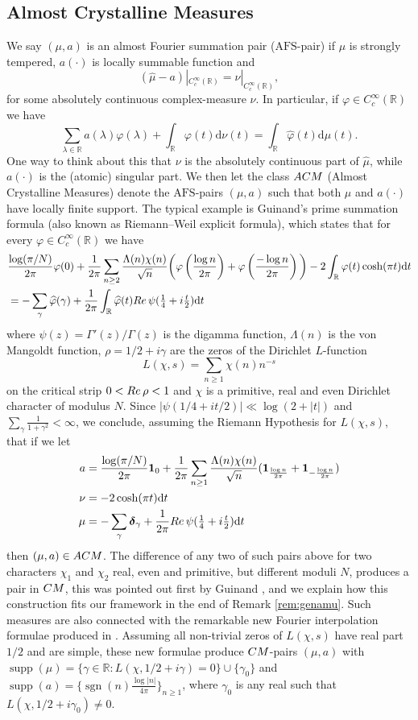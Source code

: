 \documentclass[a4paper,reqno,12pt]{amsart}
\DeclareMathOperator{\sgn}{\mathrm{sgn}}
\DeclareMathOperator{\supp}{\mathrm{supp}}
\renewcommand{\r}{\mathbb{R}}
\newcommand{\ft}{\widehat}
\newcommand{\bo}{\boldsymbol}
\newcommand{\la}{\lambda}
\newcommand{\ga}{\gamma}
\newcommand{\p}{\varphi}
\renewcommand{\d}{\mathrm{d}}
\newcommand{\1}{{\bf 1}}
\newcommand{\afs}{\mathrm{AFS}}
\newcommand{\cm}{\rm CM}
\newcommand{\acm}{\rm ACM}
\renewcommand{\1}{{\bo 1}}
\newcommand{\del}{{\bo \delta}}
\renewcommand{\Re}{{\rm Re}\,}
\renewcommand{\a}{a(\cdot)}
\begin{document}
\subsection{Almost Crystalline Measures}\label{sec:ACM}
We say $(\mu,a)$ is an almost Fourier summation pair ($\afs$-pair) if $\mu$ is strongly tempered, $\a$ is locally summable function and 
$$
(\ft \mu -a)|_{C_c^\infty(\r)}=\nu |_{C_c^\infty(\r)},
$$
for some absolutely continuous complex-measure $\nu$.  In particular, if $\p\in C_c^\infty(\r)$ we have
$$
\sum_{\la\in \r} a(\la) \p(\la)   + \int_\r  \p(t) \d \nu(t)   = \int_\r  \ft \p(t) \d \mu(t).
$$
One way to think about this that $\nu$ is the absolutely continuous part of $\ft \mu$, while $a(\cdot)$ is the (atomic) singular part. We then let the class $\acm$ (Almost Crystalline Measures) denote the $\afs$-pairs $(\mu,a)$ such that both $\mu$ and $\a$ have locally finite support.  The typical example is Guinand's prime summation formula (also known as Riemann–Weil explicit formula), which states that for every $\p\in C_c^\infty(\r)$ we have
\begin{align*}
& \frac{\log (\pi/N)}{2\pi}\p(0) + \frac{1}{2\pi}\sum_{n\geq 2} \frac{\Lambda(n)\chi(n)}{\sqrt{n}}\bigg(\p\left(\frac{\log n}{2\pi}\right) + \p\left(\frac{-\log n}{2\pi}\right)\bigg) - 2\int_\r \p(t) \cosh(\pi t) \d t  \\
& = -\sum_{\ga}  \ft \p(\ga) + \frac{1}{2\pi } \int_\r \ft \p (t) \Re \psi(\tfrac14+i\tfrac{t}2)\d t
\end{align*}
where $\psi(z)=\Gamma'(z)/\Gamma(z)$ is the digamma function, $\Lambda(n)$ is the von Mangoldt function, $\rho=1/2+i\ga$ are the zeros of the Dirichlet $L$-function $$L(\chi,s)=\sum_{n\geq 1}\chi(n)n^{-s}$$  on the critical strip $0<\Re \rho<1$ and $\chi$ is a primitive, real and even Dirichlet character of modulus $N$. Since $|\psi(1/4+it/2)| \ll \log (2+|t|)$ and $\sum_{\ga} \frac{1}{1+\ga^2} < \infty$, we conclude, assuming the Riemann Hypothesis for $L(\chi,s)$, that if we let
\begin{align*}
a&=\frac{\log (\pi/N)}{2\pi}\1_0 + \frac{1}{2\pi}\sum_{n\geq 1} \frac{\Lambda(n)\chi(n)}{\sqrt{n}}(\1_{\frac{\log n}{2\pi}} + \1_{-\frac{\log n}{2\pi}} ) \\
\nu &= -2\cosh(\pi t)\d t  \\
\mu &= -\sum_{\ga}  \del_{\ga} +  \frac{1}{2\pi}\Re \psi(\tfrac14+i\tfrac{t}2)\d t
\end{align*}
then $(\mu,a) \in \acm$. The difference of any two of such pairs above for two characters $\chi_1$ and $\chi_2$ real, even and primitive, but different moduli $N$, produces a pair in $\cm$, this was pointed out first by Guinand \cite{Gui}, and we explain how this construction fits our framework in the end of Remark \ref{rem:genamu}. Such measures are also connected with the remarkable new Fourier interpolation formulae produced in \cite{BRS}. Assuming all non-trivial zeros of $L(\chi,s)$ have real part $1/2$ and are simple, these new formulae produce $\cm$-pairs $(\mu,a)$ with $\supp(\mu)=\{\ga \in \r : L(\chi,1/2+i\ga)=0\}\cup\{\ga_0\}$ and $\supp(a)=\{ \sgn(n)\frac{\log |n|}{4\pi}\}_{n\geq 1}$, where $\ga_0$ is any real such that $L(\chi,1/2+i\ga_0)\neq 0$.
\end{document}
